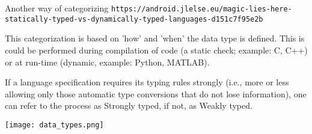 \documentclass[11pt,titlepage,fleqn]{article}
\begin{document}
\begin{section}{Another way of categorizing}
\verb+https://android.jlelse.eu/magic-lies-here-statically-typed-vs-dynamically-typed-languages-d151c7f95e2b+

This categorization is based on 'how' and 'when' the data type is defined. This is could be performed during compilation of code (a static check; example: C, C++) or at run-time (dynamic, example: Python, MATLAB). 

If a language specification requires its typing rules strongly (i.e., more or less allowing only those automatic type conversions that do not lose information), one can refer to the process as Strongly typed, if not, as Weakly typed.

\texttt{[image: data\_types.png]}
\end{section}
\end{document}
